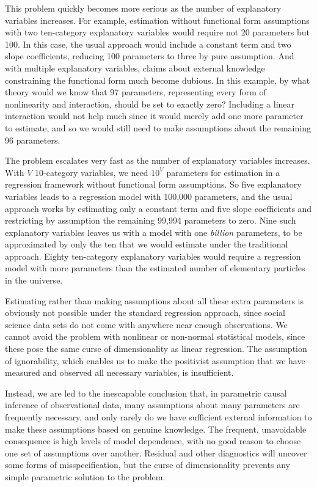 \documentclass[11pt,titlepage]{article}
\begin{document}
This problem quickly becomes more serious as the number of explanatory
variables increases.  For example, estimation without functional form
assumptions with two ten-category explanatory variables would require
not 20 parameters but 100.  In this case, the usual approach would
include a constant term and two slope coefficients, reducing 100
parameters to three by pure assumption.  And with multiple explanatory
variables, claims about external knowledge constraining the functional
form much become dubious.  In this example, by what theory would we
know that 97 parameters, representing every form of nonlinearity and
interaction, should be set to exactly zero?  Including a linear
interaction would not help much since it would merely add one more
parameter to estimate, and so we would still need to make assumptions
about the remaining 96 parameters.

The problem escalates very fast as the number of explanatory variables
increases.  With $V$ 10-category variables, we need $10^V$ parameters
for estimation in a regression framework without functional form
assumptions.  So five explanatory variables leads to a regression
model with 100,000 parameters, and the usual approach works by
estimating only a constant term and five slope coefficients and
restricting by assumption the remaining 99,994 parameters to zero.
Nine such explanatory variables leaves us with a model with one
\emph{billion} parameters, to be approximated by only the ten that we
would estimate under the traditional approach.  Eighty ten-category
explanatory variables would require a regression model with more
parameters than the estimated number of elementary particles in the
universe.

Estimating rather than making assumptions about all these extra
parameters is obviously not possible under the standard regression
approach, since social science data sets do not come with anywhere
near enough observations.  We cannot avoid the problem with nonlinear
or non-normal statistical models, since these pose the same curse of
dimensionality as linear regression.  The assumption of ignorability,
which enables us to make the positivist assumption that we have
measured and observed all necessary variables, is insufficient.

Instead, we are led to the inescapable conclusion that, in parametric
causal inference of observational data, many assumptions about many
parameters are frequently necessary, and only rarely do we have
sufficient external information to make these assumptions based on
genuine knowledge.  The frequent, unavoidable consequence is high
levels of model dependence, with no good reason to choose one set of
assumptions over another.  Residual and other diagnostics will uncover
some forms of misspecification, but the curse of dimensionality
prevents any simple parametric solution to the problem.
\end{document}
